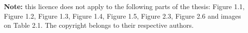 \vspace{0.2cm}
\textbf{Note: } this licence does not apply to the following parts of the thesis: Figure 1.1, Figure 1.2, Figure 1.3, Figure 1.4, Figure 1.5, Figure 2.3, Figure 2.6 and images on Table 2.1. The copyright belongs to their respective authors.

\pagebreak